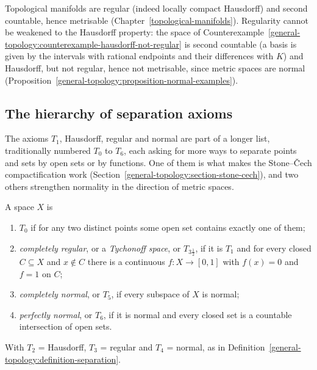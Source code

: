 \begin{remark}\label{general-topology:remark-metrisation}
Topological manifolds are regular (indeed locally compact Hausdorff) and second countable, hence metrisable (Chapter~\ref{topological-manifolds}). Regularity cannot be weakened to the Hausdorff property:
the space of Counterexample~\ref{general-topology:counterexample-hausdorff-not-regular} is second countable (a basis is given by the intervals with rational endpoints and their differences with $K$) and Hausdorff, but
not regular, hence not metrisable, since metric spaces are normal
(Proposition~\ref{general-topology:proposition-normal-examples}).
\end{remark}

\subsection{The hierarchy of separation axioms}\label{general-topology:subsection-separation-hierarchy}

The axioms $T_1$, Hausdorff, regular and normal are part of a longer list, traditionally numbered $T_0$ to $T_6$, each asking for more ways to separate points and sets by open sets or by functions. One
of them is what makes the Stone--\v{C}ech compactification work (Section~\ref{general-topology:section-stone-cech}), and two others strengthen normality in the direction of metric spaces.

\begin{definition}\label{general-topology:definition-more-separation}
A space $X$ is
\begin{enumerate}
\item \emph{$T_0$} if for any two distinct points some open set contains exactly one of them;
\item \emph{completely regular}, or a \emph{Tychonoff space}, or $T_{3\frac12}$, if it is $T_1$ and for every closed $C \subseteq X$ and $x \notin C$ there is a continuous $f \colon X \to [0, 1]$ with
$f(x) = 0$ and $f = 1$ on $C$;
\item \emph{completely normal}, or $T_5$, if every subspace of $X$ is normal;
\item \emph{perfectly normal}, or $T_6$, if it is normal and every closed set is a countable intersection of open sets.
\end{enumerate}
With $T_2$ = Hausdorff, $T_3$ = regular and $T_4$ = normal, as in Definition~\ref{general-topology:definition-separation}.
\end{definition}

